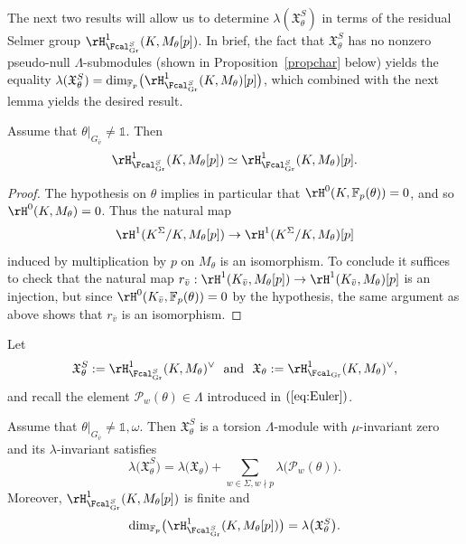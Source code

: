 The next two results will allow us to determine $\lambda(\mathfrak{X}_\theta^S)$ in terms of the residual Selmer group $\rH^1_{\Fcal_{\rm Gr}^S}(K,M_\theta[p])$. In brief, the fact that $\mathfrak{X}_\theta^S$ has no nonzero pseudo-null $\Lambda$-submodules (shown in Proposition~\ref{propchar} below) yields the equality $\lambda(\mathfrak{X}_\theta^S)=\mathrm{dim}_{\mathbb{F}_p}\bigl(\rH^{1}_{\Fcal_{\rm Gr}^S}(K,M_\theta)[p]\bigr)$, which combined with the next lemma yields the desired result.

\begin{lemma}
\notready\label{rmkchar}
Assume that $\theta\vert_{G_{\bar{v}}}\neq\mathds{1}$. Then
\[
\rH^1_{\Fcal_{\rm Gr}^S}(K,M_\theta[p])\simeq
\rH^1_{\Fcal_{\rm Gr}^S}(K,M_\theta)[p].
\]
\end{lemma}

\begin{proof}
The hypothesis on $\theta$ implies in particular that $\rH^0(K,\mathbb{F}_p(\theta))=0$, and so $\rH^0(K,M_\theta)=0$. Thus the natural map
\[
\rH^1(K^\Sigma/K,M_\theta[p])\rightarrow\rH^1(K^\Sigma/K,M_\theta)[p]
\]
induced by multiplication by $p$ on $M_\theta$ is an isomorphism. To conclude it suffices to check that the natural map $r_{\bar{v}}:\rH^1(K_{\bar{v}},M_\theta[p])\rightarrow\rH^1(K_{\bar{v}},M_\theta)[p]$ is an injection, but since $\rH^0(K_{\bar{v}},\mathbb{F}_p(\theta))=0$ by the hypothesis, the same argument as above shows that $r_{\bar{v}}$ is an isomorphism.
\end{proof}

Let
\[
\mathfrak{X}_\theta^S:=\rH^1_{\Fcal_{\rm Gr}^S}(K,M_\theta)^\vee \ \ \text{and} \ \
\mathfrak{X}_\theta:=\rH^1_{\Fcal_{\rm Gr}}(K,M_\theta)^\vee,
\]
and recall the element $\mathcal{P}_w(\theta)\in\Lambda$ introduced in $(\ref{eq:Euler})$.

\begin{prop}
\notready\label{propchar}
Assume that $\theta\vert_{G_{\bar{v}}}\neq\mathds{1},\omega$. Then
$\mathfrak{X}_{\theta}^{S}$ is a torsion $\Lambda$-module with $\mu$-invariant zero and
its $\lambda$-invariant satisfies
\begin{displaymath}
\lambda\bigl(\mathfrak{X}_{\theta}^{S}\bigr)=\lambda\bigl(\mathfrak{X}_{\theta}\bigr)+\sum_{w\in\Sigma, w\nmid p}\lambda\bigl(\mathcal{P}_w(\theta)\bigr).
\end{displaymath}
Moreover, $\rH^{1}_{\Fcal^{S}_{\rm Gr}}(K,M_\theta[p])$ is finite and
\[
\mathrm{dim}_{\mathbb{F}_p}\bigl(\rH^{1}_{\Fcal_{\rm Gr}^S}(K,M_\theta[p])\bigr)=\lambda\bigl(\mathfrak{X}_\theta^S\bigr).
\]
\end{prop}

